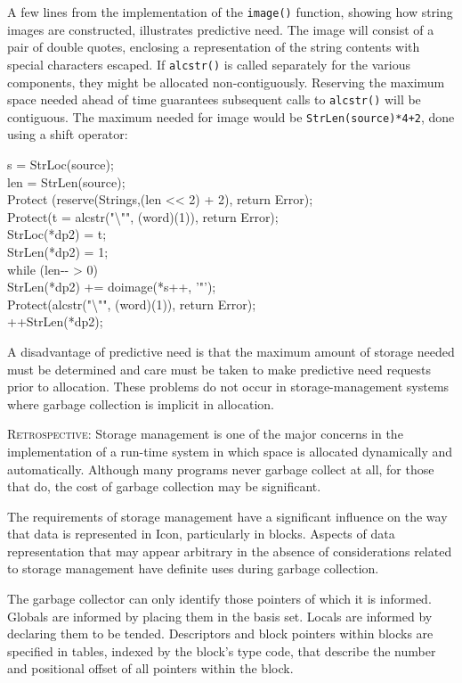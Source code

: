 A few lines from the implementation of the \texttt{image()} function,
showing how string images are constructed, illustrates predictive
need. The image will consist of a pair of double quotes, enclosing a
representation of the string contents with special characters
escaped. If \texttt{alcstr()} is called separately for the various
components, they might be allocated non-contiguously. Reserving the
maximum space needed ahead of time guarantees subsequent calls to
\texttt{alcstr()} will be contiguous. The maximum needed for image
would be \texttt{StrLen(source)*4+2}, done using a shift operator:

\begin{iconcode}
\>\>\>s = StrLoc(source);\\
\>\>\>len = StrLen(source);\\
\>\>\>Protect (reserve(Strings,(len <{}< 2) + 2), return Error);\\
\>\>\>Protect(t = alcstr("{\textbackslash}"", (word)(1)), return Error);\\
\>\>\>StrLoc(*dp2) = t;\\
\>\>\>StrLen(*dp2) = 1;\\
\>\>\>while (len-{}- > 0)\\
\>\>\>\>StrLen(*dp2) += doimage(*s++, '"');\\
\>\>\>Protect(alcstr("{\textbackslash}"", (word)(1)), return Error);\\
\>\>\>++StrLen(*dp2);
\end{iconcode}

A disadvantage of predictive need is that the maximum amount of
storage needed must be determined and care must be taken to make
predictive need requests prior to allocation. These problems do not
occur in storage-management systems where garbage collection is
implicit in allocation.


\textsc{Retrospective}: Storage management is one of the major
concerns in the implementation of a run-time system in which space is
allocated dynamically and automatically. Although many programs never
garbage collect at all, for those that do, the cost of garbage
collection may be significant.

The requirements of storage management have a significant influence on
the way that data is represented in Icon, particularly in
blocks. Aspects of data representation that may appear arbitrary in
the absence of considerations related to storage management have
definite uses during garbage collection.

The garbage collector can only identify those pointers of which it is
informed. Globals are informed by placing them in the basis
set. Locals are informed by declaring them to be tended. Descriptors
and block pointers within blocks are specified in tables, indexed by
the block's type code, that describe the number and positional offset
of all pointers within the block.

